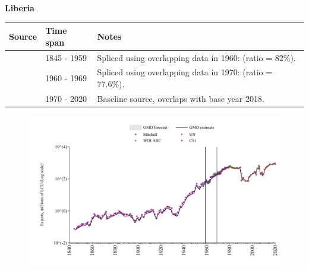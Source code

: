 \documentclass[12pt,a4paper,landscape]{article}
\begin{document}
\begin{adjustbox}{max totalsize={\paperwidth}{\paperheight},center}
\begin{minipage}[t][\textheight][t]{\textwidth}
\vspace*{0.5cm}
{}
\begin{center}
{\Large\bfseries Liberia}
\end{center}
\vspace{0.5cm}
\begin{table}[H]
\centering
\small
\begin{tabular}{|l|l|l|}
\hline
\textbf{Source} & \textbf{Time span} & \textbf{Notes} \\
\hline
\rowcolor{white}\cite{CS1_LBR}& 1845 - 1959 &Spliced using overlapping data in 1960: (ratio = 82\%).\\
\rowcolor{lightgray}\cite{WDI_ARC}& 1960 - 1969 &Spliced using overlapping data in 1970: (ratio = 77.6\%).\\
\rowcolor{white}\cite{UN}& 1970 - 2020 &Baseline source, overlaps with base year 2018.\\
\hline
\end{tabular}
\end{table}
\begin{figure}[H]
\centering
\includegraphics[width=\textwidth,height=0.6\textheight,keepaspectratio]{graphs/LBR_exports.pdf}
\end{figure}
\end{minipage}
\end{adjustbox}
\end{document}

